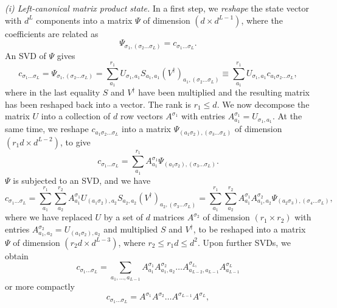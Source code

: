 {\em (i) Left-canonical matrix product state.} In a first step, we {\em reshape} the state vector with $d^L$ components into a matrix $\Psi$ of dimension $(d \times d^{L-1})$, where the coefficients are related as 
\begin{equation}
\Psi_{\sigma_1, (\sigma_2 \ldots \sigma_L)} = c_{\sigma_1 \ldots \sigma_L}  .
\end{equation}
An SVD of $\Psi$ gives
\begin{equation}
c_{\sigma_1 \ldots \sigma_L}  = \Psi_{\sigma_1, (\sigma_2 \ldots \sigma_L)} = \sum_{a_1}^{r_1} U_{\sigma_1,a_1} S_{a_1,a_1} (V^\dagger)_{a_1, (\sigma_2 \ldots \sigma_L)} \equiv \sum_{a_1}^{r_1}  U_{\sigma_1,a_1} c_{a_1\sigma_2\ldots\sigma_L} ,
\end{equation}
where in the last equality $S$ and $V^\dagger$ have been multiplied and the resulting matrix has been reshaped back into a vector. The rank is $r_1 \leq d$. We now decompose the matrix $U$ into a collection of $d$ row vectors $A^{\sigma_1}$ with entries $A^{\sigma_1}_{a_1}=U_{\sigma_1,a_1}$. At the same time, we reshape $c_{a_1\sigma_2\ldots\sigma_L}$ into a matrix $\Psi_{(a_1\sigma_2),(\sigma_3 \ldots \sigma_L)}$ of dimension $(r_1 d \times d^{L-2})$, to give
\begin{equation}
c_{\sigma_1 \ldots \sigma_L}  = \sum_{a_1}^{r_1} A^{\sigma_1}_{a_1} \Psi_{(a_1\sigma_2), (\sigma_3 \ldots \sigma_L)} .
\end{equation}
$\Psi$ is subjected to an SVD, and we have 
\begin{equation}
c_{\sigma_1 \ldots \sigma_L}  = \sum_{a_1}^{r_1} \sum_{a_2}^{r_2} A^{\sigma_1}_{a_1} U_{(a_1\sigma_2),a_2} S_{a_2,a_2} (V^\dagger)_{a_2, (\sigma_3 \ldots \sigma_L)} =  
\sum_{a_1}^{r_1} \sum_{a_2}^{r_2} A^{\sigma_1}_{a_1} A^{\sigma_2}_{a_1,a_2} \Psi_{(a_2\sigma_3), (\sigma_4 \ldots \sigma_L)} ,
\end{equation}
where we have replaced $U$ by a set of $d$ matrices $A^{\sigma_2}$ of dimension $(r_1 \times r_2)$ with entries $A^{\sigma_2}_{a_1,a_2} = U_{(a_1\sigma_2),a_2}$ and multiplied $S$ and $V^\dagger$, to be reshaped into a matrix $\Psi$ of dimension $(r_2 d \times d ^{L-3})$, where $r_2 \leq r_1 d \leq d^2$. Upon further SVDs, we obtain
\begin{equation}
c_{\sigma_1 \ldots \sigma_L} = \sum_{a_1, \ldots, a_{L-1}} A^{\sigma_1}_{a_1} A^{\sigma_2}_{a_1,a_2} \ldots A^{\sigma_{L_1}}_{a_{L-2},a_{L-1}} A^{\sigma_{L}}_{a_{L-1}}
\end{equation}
or more compactly
\begin{equation}
c_{\sigma_1 \ldots \sigma_L} = A^{\sigma_1} A^{\sigma_2} \ldots A^{\sigma_{L-1}} A^{\sigma_L} ,
\end{equation}
